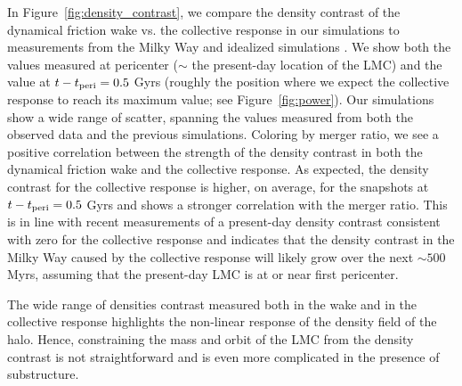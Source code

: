 \documentclass[twocolumn, linenumbers]{openjournal}
\begin{document}
In Figure~\ref{fig:density_contrast}, we compare the density contrast of the dynamical friction wake
vs. the collective response in our simulations to measurements from the Milky Way \citep{Conroy_2021} 
and idealized simulations \citep{garavito_19}.  We show both the values measured at pericenter 
($\sim$ the present-day location of the LMC) and the value at $t - t_{\rm peri} = 0.5$ Gyrs 
(roughly the position where we expect the collective response to reach its maximum value; 
see Figure~\ref{fig:power}). Our simulations show a wide range of scatter, spanning the values 
measured from both the observed data and the previous simulations. Coloring by merger ratio, we 
see a positive correlation between the strength of the density contrast in both the dynamical 
friction wake and the collective response. As expected, the density contrast for the collective 
response is higher, on average, for the snapshots at $t - t_{\rm peri} = 0.5$ Gyrs and shows a 
stronger correlation with the merger ratio. This is in line with recent measurements of a 
present-day density contrast consistent with zero for the collective response \citep{Amarante_24} 
and indicates that the density contrast in the Milky Way caused by the collective response will 
likely grow over the next $\sim 500$ Myrs, assuming that the present-day LMC is at or near first 
pericenter.  

The wide range of densities contrast measured both in the wake and in the collective response 
highlights the non-linear response of the density field of the halo. Hence, constraining the mass 
and orbit of the LMC from the density contrast is not straightforward and is even more complicated 
in the presence of substructure. 


\end{document}
